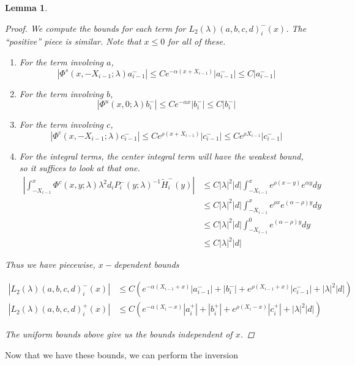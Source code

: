 \documentclass[12pt]{article}
\newtheorem{lemma}{Lemma}
\begin{document}
\begin{lemma}
\begin{proof}
We compute the bounds for each term for $L_2(\lambda)(a,b,c,d)_i^-(x)$. The ``positive'' piece is similar. Note that $x \leq 0$ for all of these.

\begin{enumerate}
\item For the term involving $a$,
\[
|\Phi^s(x, -X_{i-1}; \lambda) a_{i-1}^-| 
\leq C e^{-\alpha(x + X_{i-1})} | a_{i-1}^-| \leq C | a_{i-1}^-|
\]
\item For the term involving $b$,
\[
|\Phi^u(x, 0; \lambda) b_i^-| \leq C e^{-\alpha x}|b_i^-| \leq C |b_i^-|
\]
\item For the term involving $c$,
\[
|\Phi^c(x, -X_{i-1}; \lambda) c_{i-1}^-| 
\leq C e^{\rho(x + X_{i-1})}|c_{i-1}^-| \leq C e^{\rho X_{i-1}}|c_{i-1}^-|
\]
\item For the integral terms, the center integral term will have the weakest bound, so it suffices to look at that one.
\begin{align*}
\left| \int_{-X_{i-1}}^x \Phi^c(x, y; \lambda) \lambda^2 d_i P_i^-(y; \lambda)^{-1} \tilde{H}_i^-(y) \right| 
&\leq C |\lambda|^2 |d| \int_{-X_{i-1}}^x e^{\rho(x-y) }e^{\alpha y} dy \\
&\leq C |\lambda|^2 |d| \int_{-X_{i-1}}^x e^{\rho x} e^{(\alpha - \rho) y} dy \\
&\leq C |\lambda|^2 |d| \int_{-X_{i-1}}^0 e^{(\alpha - \rho) y} dy \\
&\leq C |\lambda|^2 |d|
\end{align*}

\end{enumerate}

Thus we have piecewise, $x-$dependent bounds

\begin{align*}
|L_2(\lambda)(a,b,c,d)_i^-(x)| &\leq C (e^{-\alpha(X_{i-1} + x)}|a_{i-1}^-| + |b_i^-| + e^{\rho(X_{i-1} + x)} |c_{i-1}^-| + |\lambda|^2 |d| ) \\
|L_2(\lambda)(a,b,c,d)_i^+(x)| &\leq C (e^{-\alpha(X_i - x)}|a_i^+| + |b_i^+| + e^{\rho(X_i - x)} |c_i^+| + |\lambda|^2 |d| ) 
\end{align*}

The uniform bounds above give us the bounds independent of $x$.
\end{proof}
\end{lemma}

Now that we have these bounds, we can perform the inversion

\end{document}
